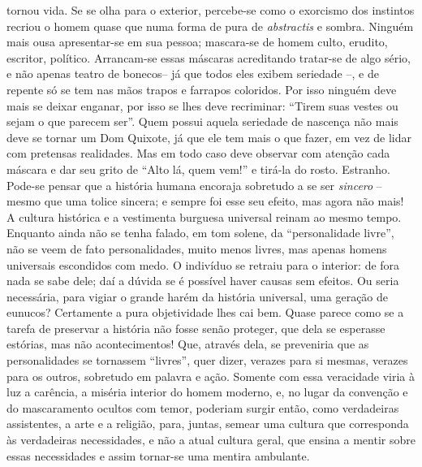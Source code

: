 tornou vida. Se se olha para o exterior, percebe-se como o exorcismo dos
instintos recriou o homem quase que numa forma de pura de
\emph{abstractis} e sombra. Ninguém mais ousa apresentar-se em sua
pessoa; mascara-se de homem culto, erudito, escritor, político.
Arrancam-se essas máscaras acreditando tratar-se de algo sério, e não
apenas teatro de bonecos-- já que todos eles exibem seriedade --, e de
repente só se tem nas mãos trapos e farrapos coloridos. Por isso ninguém
deve mais se deixar enganar, por isso se lhes deve recriminar: ``Tirem
suas vestes ou sejam o que parecem ser''. Quem possui aquela seriedade
de nascença não mais deve se tornar um Dom Quixote, já que ele tem mais
o que fazer, em vez de lidar com pretensas realidades. Mas em todo caso
deve observar com atenção cada máscara e dar seu grito de ``Alto lá,
quem vem!'' e tirá-la do rosto. Estranho. Pode-se pensar que a história
humana encoraja sobretudo a se ser \emph{sincero} -- mesmo que uma
tolice sincera; e sempre foi esse seu efeito, mas agora não mais! A
cultura histórica e a vestimenta burguesa universal reinam ao mesmo
tempo. Enquanto ainda não se tenha falado, em tom solene, da
``personalidade livre'', não se veem de fato personalidades, muito menos
livres, mas apenas homens universais escondidos com medo. O indivíduo se
retraiu para o interior: de fora nada se sabe dele; daí a dúvida se é
possível haver causas sem efeitos. Ou seria necessária, para vigiar o
grande harém da história universal, uma geração de eunucos? Certamente a
pura objetividade lhes cai bem. Quase parece como se a tarefa de
preservar a história não fosse senão proteger, que dela se esperasse
estórias, mas não acontecimentos! Que, através dela, se preveniria que
as personalidades se tornassem ``livres'', quer dizer, verazes para si
mesmas, verazes para os outros, sobretudo em palavra e ação. Somente com
essa veracidade viria à luz a carência, a miséria interior do homem
moderno, e, no lugar da convenção e do mascaramento ocultos com temor,
poderiam surgir então, como verdadeiras assistentes, a arte e a
religião, para, juntas, semear uma cultura que corresponda às
verdadeiras necessidades, e não a atual cultura geral, que ensina a
mentir sobre essas necessidades e assim tornar-se uma mentira ambulante.

